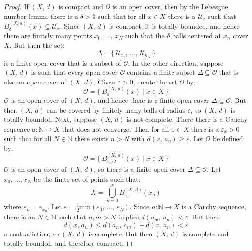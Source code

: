 \documentclass{article}
\theoremstyle{plain}
\theoremstyle{normal}
\begin{document}
        \begin{proof}
            If $(X,\,d)$ is compact and $\mathcal{O}$ is an open cover, then
            by the Lebesgue number lemma there is a $\delta>0$ such that for
            all $x\in{X}$ there is a $\mathcal{U}_{x}$ such that
            $B_{\delta}^{(X,\,d)}(x)\subseteq\mathcal{U}_{x}$. Since
            $(X,\,d)$ is compact, it is totally bounded, and hence there are
            finitely many points $x_{0},\,\dots,\,x_{N}$ such that the
            $\delta$ balls centered at $x_{n}$ cover $X$. But then the set:
            \begin{equation}
                \Delta=\{\,\mathcal{U}_{x_{0}},\,\dots,\,\mathcal{U}_{n_{N}}\,\}
            \end{equation}
            is a finite open cover that is a subset of $\mathcal{O}$. In the
            other direction, suppose $(X,\,d)$ is such that every open cover
            $\mathcal{O}$ contains a finite subset $\Delta\subseteq\mathcal{O}$
            that is also an open cover of $(X,\,d)$. Given $\varepsilon>0$,
            create the set $\mathcal{O}$ by:
            \begin{equation}
                \mathcal{O}=\{\,B_{\varepsilon}^{(X,\,d)}(x)\;|\;x\in{X}\,\}
            \end{equation}
            $\mathcal{O}$ is an open cover of $(X,\,d)$, and hence there is a
            finite open cover $\Delta\subseteq\mathcal{O}$. But then $(X,\,d)$
            can be covered by finitely many balls of radius $\varepsilon$, so
            $(X,\,d)$ is totally bounded. Next, suppose $(X,\,d)$ is not
            complete. There there is a Cauchy sequence
            $a:\mathbb{N}\rightarrow{X}$ that does not converge. Then for all
            $x\in{X}$ there is a $\varepsilon_{x}>0$ such that for all
            $N\in\mathbb{N}$ there exists $n>N$ with
            $d(x,\,a_{n})\geq\varepsilon$. Let $\mathcal{O}$ be defined by:
            \begin{equation}
                \mathcal{O}=\{\,B_{\varepsilon_{x}/2}^{(X,\,d)}(x)\;|\;x\in{X}\,\}
            \end{equation}
            $\mathcal{O}$ is an open cover of $(X,\,d)$, so there is a finite
            open cover $\Delta\subseteq\mathcal{O}$. Let
            $x_{0},\,\dots,x_{N}$ be the finite set of points such that:
            \begin{equation}
                X=\bigcup_{n=0}^{N}B_{\varepsilon_{n}}^{(X,\,d)}(x_{n})
            \end{equation}
            where $\varepsilon_{n}=\varepsilon_{x_{n}}$. Let
            $\varepsilon=\frac{1}{2}\textrm{min}(\varepsilon_{0},\,\dots,\,\varepsilon_{N})$.
            Since $a:\mathbb{N}\rightarrow{X}$ is a Cauchy sequence, there is
            an $N\in\mathbb{N}$ such that $n,m>N$ implies
            $d(a_{m},\,a_{n})<\varepsilon$. But then:
            \begin{equation}
                d(x,\,a_{n})\leq{d}(a_{n},\,a_{m})+d(x,\,a_{n})<\varepsilon
            \end{equation}
            a contradiction, so $(X,\,d)$ is complete. But then
            $(X,\,d)$ is complete and totally bounded, and therefore compact.
        \end{proof}
\end{document}
